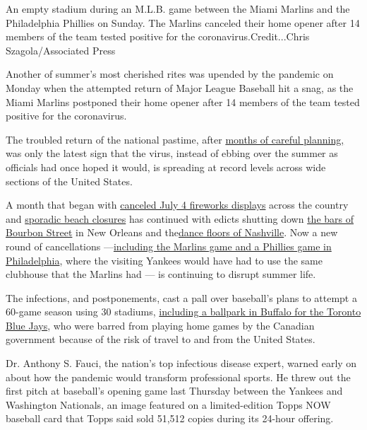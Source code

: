 An empty stadium during an M.L.B. game between the Miami Marlins and the
Philadelphia Phillies on Sunday. The Marlins canceled their home opener
after 14 members of the team tested positive for the
coronavirus.Credit...Chris Szagola/Associated Press

Another of summer's most cherished rites was upended by the pandemic on
Monday when the attempted return of Major League Baseball hit a snag, as
the Miami Marlins postponed their home opener after 14 members of the
team tested positive for the coronavirus.

The troubled return of the national pastime, after
\href{https://www.nytimes.com/2020/07/25/sports/rob-manfred-mlb-season.html}{months
of careful planning,} was only the latest sign that the virus, instead
of ebbing over the summer as officials had once hoped it would, is
spreading at record levels across wide sections of the United States.

A month that began with
\href{https://www.nytimes.com/2020/07/02/us/coronavirus-fourth-of-july.html}{canceled
July 4 fireworks displays} across the country and
\href{https://www.miamigov.com/Notices/News-Media/4th-of-July-Weekend-in-the-City-of-Miami}{sporadic
beach closures} has continued with edicts shutting down
\href{https://www.nola.com/news/coronavirus/article_0a3bbc54-ce03-11ea-97ba-cfbad95a9c94.html}{the
bars of Bourbon Street} in New Orleans and
the\href{https://www.asafenashville.org/roadmap-for-reopening-nashville-phase-2-guidance-and-resources/}{dance
floors of Nashville}. Now a new round of cancellations
---\href{https://www.nytimes.com/2020/07/27/sports/baseball/marlins-game-canceled.html}{including
the Marlins game and a Phillies game in Philadelphia}, where the
visiting Yankees would have had to use the same clubhouse that the
Marlins had --- is continuing to disrupt summer life.

The infections, and postponements, cast a pall over baseball's plans to
attempt a 60-game season using 30 stadiums,
\href{https://www.nytimes.com/2020/07/24/sports/baseball/blue-jays-buffalo.html}{including
a ballpark in Buffalo for the Toronto Blue Jays}, who were barred from
playing home games by the Canadian government because of the risk of
travel to and from the United States.

Dr. Anthony S. Fauci, the nation's top infectious disease expert, warned
early on about how the pandemic would transform professional sports. He
threw out the first pitch at baseball's opening game last Thursday
between the Yankees and Washington Nationals, an image featured on a
limited-edition Topps NOW baseball card that Topps said sold 51,512
copies during its 24-hour offering.


